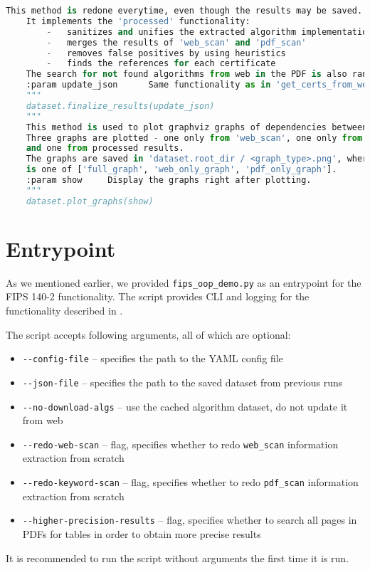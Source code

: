 \begin{lstlisting}[language=python,caption=Example of using FIPS 140-2 functionality of \texttt{sec-certs}, label={code}]
    This method is redone everytime, even though the results may be saved.
    It implements the 'processed' functionality:
        -   sanitizes and unifies the extracted algorithm implementation and module IDs
        -   merges the results of 'web_scan' and 'pdf_scan'
        -   removes false positives by using heuristics
        -   finds the references for each certificate
    The search for not found algorithms from web in the PDF is also ran here.
    :param update_json      Same functionality as in 'get_certs_from_web()' method.
    """
    dataset.finalize_results(update_json)
    """
    This method is used to plot graphviz graphs of dependencies between the certificates.
    Three graphs are plotted - one only from 'web_scan', one only from 'pdf_scan'
    and one from processed results.
    The graphs are saved in 'dataset.root_dir / <graph_type>.png', where <graph_type>
    is one of ['full_graph', 'web_only_graph', 'pdf_only_graph'].
    :param show     Display the graphs right after plotting.
    """
    dataset.plot_graphs(show)
\end{lstlisting}

\section{Entrypoint}\label{entrypoint}

As we mentioned earlier, we provided \texttt{fips\_oop\_demo.py} as an entrypoint for the FIPS 140-2 functionality. The script provides CLI and logging for the functionality described in .

The script accepts following arguments, all of which are optional:
\begin{itemize}
    \item \texttt{-{}-config-file} -- specifies the path to the YAML config file
    \item \texttt{-{}-json-file} -- specifies the path to the saved dataset from previous runs
    \item \texttt{-{}-no-download-algs} -- use the cached algorithm dataset, do not update it from web
    \item \texttt{-{}-redo-web-scan} -- flag, specifies whether to redo \texttt{web\_scan} information extraction from scratch
    \item \texttt{-{}-redo-keyword-scan} -- flag, specifies whether to redo \texttt{pdf\_scan} information extraction from scratch
    \item \texttt{-{}-higher-precision-results} -- flag, specifies whether to search all pages in PDFs for tables in order to obtain more precise results 
\end{itemize}
It is recommended to run the script without arguments the first time it is run.

